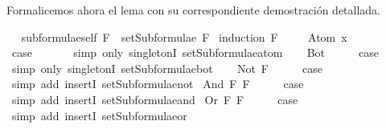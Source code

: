 \begin{isabellebody}
\begin{isamarkuptext}
  Formalicemos ahora el lema con su correspondiente demostración 
  detallada.%
\end{isamarkuptext}\isamarkuptrue%
\ \isanewline
{}\isamarkupfalse%
\ subformulae{\isacharunderscore}self{\isacharcolon}\ {\isachardoublequoteopen}F\ {\isasymin}\ setSubformulae\ F{\isachardoublequoteclose}\isanewline
%
\isadelimproof
%
\endisadelimproof
%
\isatagproof
{}\isamarkupfalse%
\ {\isacharparenleft}induction\ F{\isacharparenright}\ \isanewline
\ \ \isamarkupfalse%
\ {\isacharparenleft}Atom\ x{\isacharparenright}\ \isanewline
\ \ \isamarkupfalse%
\ \isamarkupfalse%
\ {\isacharquery}case\ \isanewline
\ \ \ \ \isamarkupfalse%
\ {\isacharparenleft}simp\ only{\isacharcolon}\ singletonI\ setSubformulae{\isacharunderscore}atom{\isacharparenright}\isanewline
{}\isamarkupfalse%
\isanewline
\ \ \isamarkupfalse%
\ Bot\isanewline
\ \ \isamarkupfalse%
\ \isamarkupfalse%
\ {\isacharquery}case\ \isanewline
\ \ \ \ \isamarkupfalse%
\ {\isacharparenleft}simp\ only{\isacharcolon}\ singletonI\ setSubformulae{\isacharunderscore}bot{\isacharparenright}\isanewline
{}\isamarkupfalse%
\isanewline
\ \ \isamarkupfalse%
\ {\isacharparenleft}Not\ F{\isacharparenright}\isanewline
\ \ \isamarkupfalse%
\ \isamarkupfalse%
\ {\isacharquery}case\ \isanewline
\ \ \ \ \isamarkupfalse%
\ {\isacharparenleft}simp\ add{\isacharcolon}\ insertI{}\ setSubformulae{\isacharunderscore}not{\isacharparenright}\isanewline
{}\isamarkupfalse%
\isanewline
{}\isamarkupfalse%
\ {\isacharparenleft}And\ F{}\ F{}{\isacharparenright}\isanewline
\ \ \isamarkupfalse%
\ \isamarkupfalse%
\ {\isacharquery}case\ \isanewline
\ \ \ \ \isamarkupfalse%
\ {\isacharparenleft}simp\ add{\isacharcolon}\ insertI{}\ setSubformulae{\isacharunderscore}and{\isacharparenright}\isanewline
{}\isamarkupfalse%
\isanewline
{}\isamarkupfalse%
\ {\isacharparenleft}Or\ F{}\ F{}{\isacharparenright}\isanewline
\ \ \isamarkupfalse%
\ \isamarkupfalse%
\ {\isacharquery}case\ \isanewline
\ \ \ \ \isamarkupfalse%
\ {\isacharparenleft}simp\ add{\isacharcolon}\ insertI{}\ setSubformulae{\isacharunderscore}or{\isacharparenright}\isanewline

\end{isabellebody}
